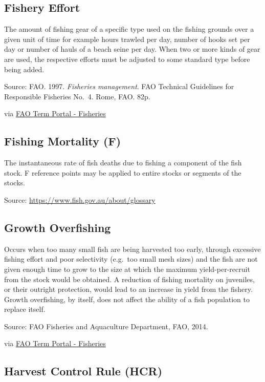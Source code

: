 \documentclass[
  11pt,
]{book}
\begin{document}
\hypertarget{fishery-effort}{%
\subsection{Fishery Effort}\label{fishery-effort}}

The amount of fishing gear of a specific type used on the fishing grounds over a given unit of time for example hours trawled per day, number of hooks set per day or number of hauls of a beach seine per day. When two or more kinds of gear are used, the respective efforts must be adjusted to some standard type before being added.

Source: FAO. 1997. \emph{Fisheries management}. FAO Technical Guidelines for Responsible Fisheries No.~4. Rome, FAO. 82p.

via \href{http://www.fao.org/fishery/glossary/en}{FAO Term Portal - Fisheries}

\hypertarget{fishing-mortality-f}{%
\subsection{Fishing Mortality (F)}\label{fishing-mortality-f}}

The instantaneous rate of fish deaths due to fishing a component of the fish stock. F reference points may be applied to entire stocks or segments of the stocks.

Source: \url{https://www.fish.gov.au/about/glossary}

\hypertarget{growth-overfishing}{%
\subsection{Growth Overfishing}\label{growth-overfishing}}

Occurs when too many small fish are being harvested too early, through excessive fishing effort and poor selectivity (e.g.~too small mesh sizes) and the fish are not given enough time to grow to the size at which the maximum yield-per-recruit from the stock would be obtained. A reduction of fishing mortality on juveniles, or their outright protection, would lead to an increase in yield from the fishery. Growth overfishing, by itself, does not affect the ability of a fish population to replace itself.

Source: FAO Fisheries and Aquaculture Department, FAO, 2014.

via \href{http://www.fao.org/fishery/glossary/en}{FAO Term Portal - Fisheries}

\hypertarget{harvest-control-rule-hcr}{%
\subsection{Harvest Control Rule (HCR)}\label{harvest-control-rule-hcr}}
\end{document}

